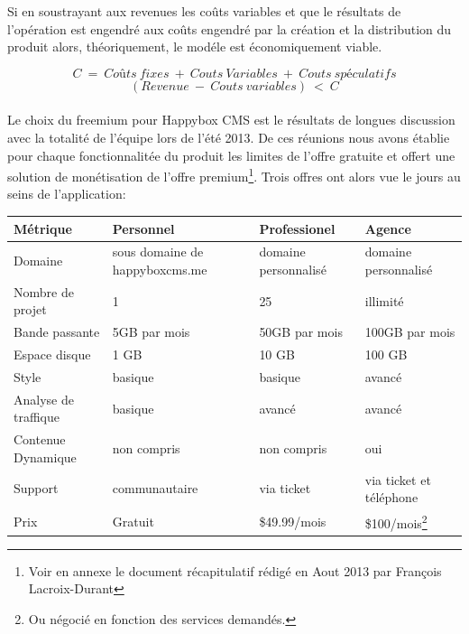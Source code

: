 \documentclass[11pt, a4paper ]{article}
\begin{document}
\begin{spacing}{1.5}
Si en soustrayant aux revenues les coûts variables et que le résultats de l'opération est engendré aux coûts engendré par la création et la distribution du produit alors, théoriquement, le modéle est économiquement viable.

\begin{equation}
	C\ =\ Coûts\ fixes\ +\ Couts\ Variables\ +\ Couts\ spéculatifs
\end{equation}
\begin{equation}
	(Revenue\ -\ Couts\ variables)\ <\ C
\end{equation}

\paragraph{} %
Le choix du freemium pour Happybox CMS est le résultats de longues discussion avec la totalité de l'équipe lors de l'été 2013. De ces réunions nous avons établie pour chaque fonctionnalitée du produit les limites de l'offre gratuite et offert une solution de monétisation de l'offre premium\footnote{Voir en annexe le document récapitulatif rédigé en Aout 2013 par François Lacroix-Durant}.
Trois offres ont alors vue le jours au seins de l'application:

\begin{flushleft}
	\begin{tabular}{|l|l|l|l|}
		Métrique & Personnel & Professionel & Agence \\
		\hline
		Domaine & sous domaine de happyboxcms.me & domaine personnalisé & domaine personnalisé \\
		Nombre de projet & 1 & 25 & illimité \\
		Bande passante & 5GB par mois & 50GB par mois & 100GB par mois \\
		Espace disque & 1 GB & 10 GB & 100 GB \\
		Style & basique & basique & avancé \\
		Analyse de traffique & basique & avancé & avancé \\
		Contenue Dynamique & non compris & non compris & oui \\
		Support & communautaire & via ticket & via ticket et téléphone  \\
		Prix & Gratuit & \$49.99/mois & \$100/mois\footnote{Ou négocié en fonction des services demandés.} \\


\end{tabular}
\end{flushleft}
\end{spacing}
\end{document}
